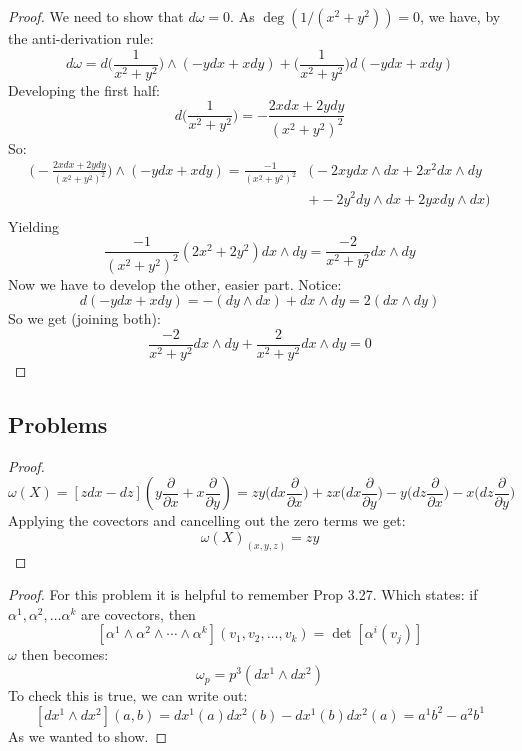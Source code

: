 \begin{customprob}{4.9}
\end{customprob}

\begin{proof}
	We need to show that $d\omega = 0$. As $\deg(1/(x^2 + y^2)) = 0$, we have, by the anti-derivation rule:
	$$d\omega = d\bigg(\frac{1}{x^2  +y^2} \bigg) \wedge (-ydx + xdy) + \bigg(\frac{1}{x^2  +y^2} \bigg) d(-y dx + xdy)$$
	Developing the first half:
	$$d\bigg(\frac{1}{x^2  +y^2} \bigg) = - \frac{2xdx + 2ydy}{(x^2 + y^2)^2}$$
	So:
	\begin{align*}
		\bigg(-\frac{2xdx + 2ydy}{(x^2 + y^2)^2}\bigg) \wedge (-ydx + xdy)  =
		\frac{-1}{(x^2 + y^2)^2} & \Bigg( -2xy dx\wedge dx + 2x^2dx \wedge dy     \\
		                         & + -2y^2 dy \wedge dx + 2yx dy \wedge dx \Bigg) \\
	\end{align*}
	Yielding
	$$\frac{-1}{(x^2 + y^2)^2}(2x^2 + 2y^2) dx\wedge dy = \frac{-2}{x^2 + y^2} dx \wedge dy$$
	Now we have to develop the other, easier part. Notice:
	$$d(-y dx + xdy) = - (dy \wedge dx) + dx\wedge dy = 2(dx \wedge dy)$$
	So we get (joining both):
	$$ \frac{-2}{x^2 + y^2} dx \wedge dy +  \frac{2}{x^2 + y^2} dx \wedge dy = 0$$
\end{proof}

\subsection{Problems}

\begin{problem}
\end{problem}

\begin{proof}
	$$\omega(X) = [zdx - dz](y\frac{\partial}{\partial x} + x\frac{\partial}{\partial y}) =
		zy \bigg(dx \frac{\partial}{\partial x}\bigg) + zx \bigg(dx \frac{\partial}{\partial y}\bigg)
		- y \bigg(dz \frac{\partial}{\partial x} \bigg) - x \bigg(dz \frac{\partial}{\partial y} \bigg)$$
	Applying the covectors and cancelling out the zero terms we get:
	$$\omega(X)_{(x,y,z)} = zy$$
\end{proof}

\begin{problem}
\end{problem}

\begin{proof}
	For this problem it is helpful to remember Prop 3.27. Which states: if $\alpha^1, \alpha^2, \dots \alpha^k$ are covectors, then
	$$[\alpha^1 \wedge \alpha^2 \wedge \cdots \wedge \alpha^k](v_1, v_2, \dots, v_k) = \det [\alpha^i(v_j)]$$
	$\omega$ then becomes:
	$$\omega_p = p^3(dx^1 \wedge dx^2)$$
	To check this is true, we can write out:
	$$[dx^1 \wedge dx^2](a, b) = dx^1(a)dx^2(b) - dx^1(b)dx^2(a) = a^1b^2 - a^2b^1 $$
	As we wanted to show.
\end{proof}

